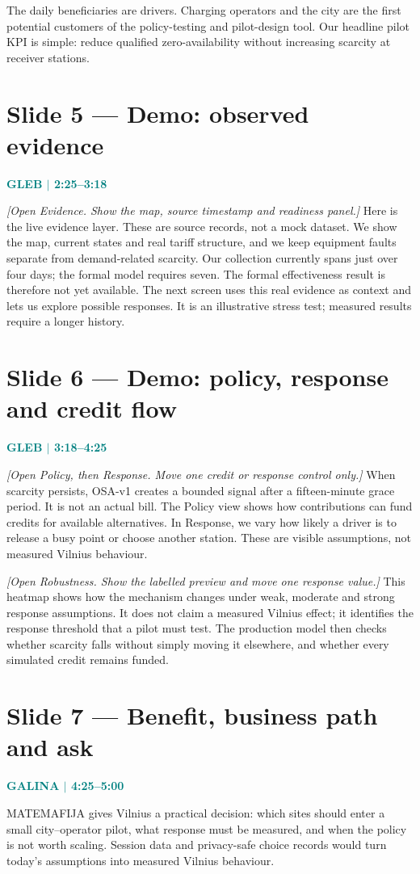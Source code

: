 \documentclass[11pt,a4paper]{article}
\newcommand{\speaker}[2]{\vspace{1mm}\textcolor{teal}{\textbf{#1 $\mid$ #2}}\par}
\newcommand{\cue}[1]{\textcolor{amber}{\textit{[#1]}}}
\begin{document}
The daily beneficiaries are drivers. Charging operators and the city are the first potential customers of the policy-testing and pilot-design tool. Our headline pilot KPI is simple: reduce qualified zero-availability without increasing scarcity at receiver stations.

\section*{Slide 5 --- Demo: observed evidence}
\speaker{GLEB}{2:25--3:18}
\cue{Open Evidence. Show the map, source timestamp and readiness panel.}
Here is the live evidence layer. These are source records, not a mock dataset. We show the map, current states and real tariff structure, and we keep equipment faults separate from demand-related scarcity. Our collection currently spans just over four days; the formal model requires seven. The formal effectiveness result is therefore not yet available. The next screen uses this real evidence as context and lets us explore possible responses. It is an illustrative stress test; measured results require a longer history.

\section*{Slide 6 --- Demo: policy, response and credit flow}
\speaker{GLEB}{3:18--4:25}
\cue{Open Policy, then Response. Move one credit or response control only.}
When scarcity persists, OSA-v1 creates a bounded signal after a fifteen-minute grace period. It is not an actual bill. The Policy view shows how contributions can fund credits for available alternatives. In Response, we vary how likely a driver is to release a busy point or choose another station. These are visible assumptions, not measured Vilnius behaviour.

\cue{Open Robustness. Show the labelled preview and move one response value.}
This heatmap shows how the mechanism changes under weak, moderate and strong response assumptions. It does not claim a measured Vilnius effect; it identifies the response threshold that a pilot must test. The production model then checks whether scarcity falls without simply moving it elsewhere, and whether every simulated credit remains funded.

\section*{Slide 7 --- Benefit, business path and ask}
\speaker{GALINA}{4:25--5:00}
MATEMAFIJA gives Vilnius a practical decision: which sites should enter a small city--operator pilot, what response must be measured, and when the policy is not worth scaling. Session data and privacy-safe choice records would turn today's assumptions into measured Vilnius behaviour.
\end{document}

